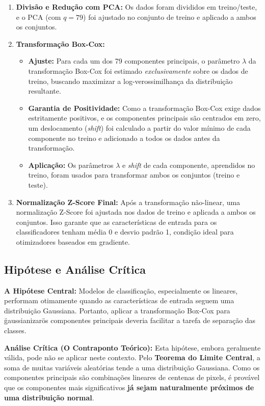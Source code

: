 \documentclass[a4paper,12pt]{article}
\begin{document}
\begin{enumerate}
    \item \textbf{Divisão e Redução com PCA:} Os dados foram divididos em treino/teste, e o PCA (com \(q=79\)) foi ajustado no conjunto de treino e aplicado a ambos os conjuntos. 
    
    \item \textbf{Transformação Box-Cox:}
    \begin{itemize}
        \item \textbf{Ajuste:} Para cada um dos 79 componentes principais, o parâmetro \(\lambda\) da transformação Box-Cox foi estimado \emph{exclusivamente} sobre os dados de treino, buscando maximizar a log-verossimilhança da distribuição resultante.
        \item \textbf{Garantia de Positividade:} Como a transformação Box-Cox exige dados estritamente positivos, e os componentes principais são centrados em zero, um deslocamento (\emph{shift}) foi calculado a partir do valor mínimo de cada componente no treino e adicionado a todos os dados antes da transformação.
        \item \textbf{Aplicação:} Os parâmetros \(\lambda\) e \emph{shift} de cada componente, aprendidos no treino, foram usados para transformar ambos os conjuntos (treino e teste).
    \end{itemize}
    
    \item \textbf{Normalização Z-Score Final:} Após a transformação não-linear, uma normalização Z-Score foi ajustada nos dados de treino e aplicada a ambos os conjuntos. Isso garante que as características de entrada para os classificadores tenham média 0 e desvio padrão 1, condição ideal para otimizadores baseados em gradiente.
\end{enumerate}

\subsection{Hipótese e Análise Crítica}

\noindent\textbf{A Hipótese Central:} Modelos de classificação, especialmente os lineares, performam otimamente quando as características de entrada seguem uma distribuição Gaussiana. Portanto, aplicar a transformação Box-Cox para \"gaussianizar\" os componentes principais deveria facilitar a tarefa de separação das classes. 

\noindent\textbf{Análise Crítica (O Contraponto Teórico):} Esta hipótese, embora geralmente válida, pode não se aplicar neste contexto. Pelo \textbf{Teorema do Limite Central}, a soma de muitas variáveis aleatórias tende a uma distribuição Gaussiana. Como os componentes principais são combinações lineares de centenas de pixels, é provável que os componentes mais significativos \textbf{já sejam naturalmente próximos de uma distribuição normal}. 
\end{document}
